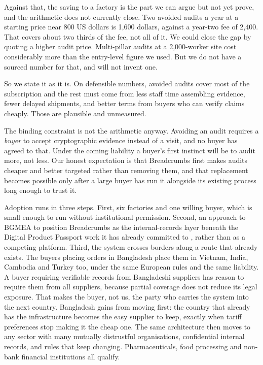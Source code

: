 \documentclass[11pt,a4paper]{article}
\begin{document}
Against that, the saving to a factory is the part we can argue but not yet
prove, and the arithmetic does not currently close. Two avoided audits a year at
a starting price near 800 US dollars is 1{,}600 dollars, against a year-two fee
of 2{,}400. That covers about two thirds of the fee, not all of it. We could
close the gap by quoting a higher audit price. Multi-pillar audits at a
2{,}000-worker site cost considerably more than the entry-level figure we used.
But we do not have a sourced number for that, and will not invent one.

So we state it as it is. On defensible numbers, avoided audits cover most of the
subscription and the rest must come from less staff time assembling evidence,
fewer delayed shipments, and better terms from buyers who can verify claims
cheaply. Those are plausible and unmeasured.

The binding constraint is not the arithmetic anyway. Avoiding an audit requires a
\emph{buyer} to accept cryptographic evidence instead of a visit, and no buyer
has agreed to that. Under the coming liability a buyer's first instinct will be
to audit more, not less. Our honest expectation is that Breadcrumbs first makes
audits cheaper and better targeted rather than removing them, and that
replacement becomes possible only after a large buyer has run it alongside its
existing process long enough to trust it.

Adoption runs in three steps. First, six factories and one willing buyer, which
is small enough to run without institutional permission. Second, an approach to
BGMEA to position Breadcrumbs as the internal-records layer beneath the Digital
Product Passport work it has already committed to
\citep{bgmea2025digiprod,bgmea2026aware}, rather than as a competing platform.
Third, the system crosses borders along a route that already exists. The buyers
placing orders in Bangladesh place them in Vietnam, India, Cambodia and Turkey
too, under the same European rules and the same liability. A buyer requiring
verifiable records from Bangladeshi suppliers has reason to require them from
all suppliers, because partial coverage does not reduce its legal exposure. That
makes the buyer, not us, the party who carries the system into the next country.
Bangladesh gains from moving first: the country that already has the
infrastructure becomes the easy supplier to keep, exactly when tariff
preferences stop making it the cheap one. The same architecture then moves to
any sector with many mutually distrustful organisations, confidential internal
records, and rules that keep changing. Pharmaceuticals, food processing and
non-bank financial institutions all qualify.
\end{document}

